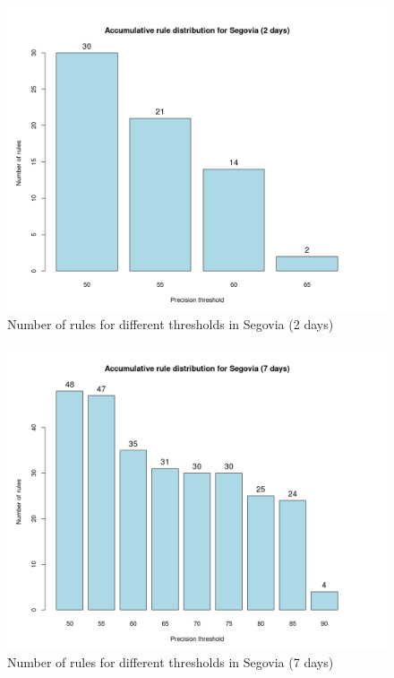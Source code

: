 \begin{figure}[hbtp]
\includegraphics[width=\textwidth]{img/precision_seg2.png}
\caption{Number of rules for different thresholds in Segovia (2 days)} \label{fig:precision_seg2}
\end{figure}

\begin{figure}[hbtp]
\includegraphics[width=\textwidth]{img/precision_seg7.png}
\caption{Number of rules for different thresholds in Segovia (7 days)} \label{fig:precision_seg7}
\end{figure}

